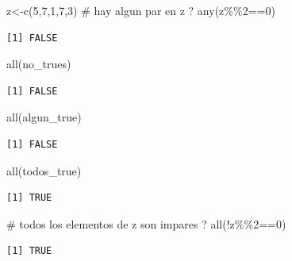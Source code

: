\documentclass[
  ignorenonframetext,
  aspectratio=169,
  spanish,
]{beamer}
\newenvironment{Shaded}{\begin{snugshade}}{\end{snugshade}}
\newcommand{\CommentTok}[1]{\textcolor[rgb]{0.37,0.37,0.37}{#1}}
\newcommand{\DecValTok}[1]{\textcolor[rgb]{0.68,0.00,0.00}{#1}}
\newcommand{\FunctionTok}[1]{\textcolor[rgb]{0.28,0.35,0.67}{#1}}
\newcommand{\NormalTok}[1]{\textcolor[rgb]{0.00,0.23,0.31}{#1}}
\newcommand{\OtherTok}[1]{\textcolor[rgb]{0.00,0.23,0.31}{#1}}
\newcommand{\SpecialCharTok}[1]{\textcolor[rgb]{0.37,0.37,0.37}{#1}}
\begin{document}
\begin{frame}[fragile]{}
\label{section-16}
\begin{Shaded}
\begin{Highlighting}[]
\NormalTok{z}\OtherTok{\textless{}{-}}\FunctionTok{c}\NormalTok{(}\DecValTok{5}\NormalTok{,}\DecValTok{7}\NormalTok{,}\DecValTok{1}\NormalTok{,}\DecValTok{7}\NormalTok{,}\DecValTok{3}\NormalTok{)}
\CommentTok{\# hay algun par en z ? }
\FunctionTok{any}\NormalTok{(z}\SpecialCharTok{\%\%}\DecValTok{2}\SpecialCharTok{==}\DecValTok{0}\NormalTok{)}
\end{Highlighting}
\end{Shaded}

\begin{verbatim}
[1] FALSE
\end{verbatim}
\end{frame}

\begin{frame}[fragile]{}
\label{section-17}
\begin{Shaded}
\begin{Highlighting}[]
\FunctionTok{all}\NormalTok{(no\_trues)}
\end{Highlighting}
\end{Shaded}

\begin{verbatim}
[1] FALSE
\end{verbatim}

\begin{Shaded}
\begin{Highlighting}[]
\FunctionTok{all}\NormalTok{(algun\_true)}
\end{Highlighting}
\end{Shaded}

\begin{verbatim}
[1] FALSE
\end{verbatim}

\begin{Shaded}
\begin{Highlighting}[]
\FunctionTok{all}\NormalTok{(todos\_true)}
\end{Highlighting}
\end{Shaded}

\begin{verbatim}
[1] TRUE
\end{verbatim}

\begin{Shaded}
\begin{Highlighting}[]
\CommentTok{\# todos los elementos de z son impares ?}
\FunctionTok{all}\NormalTok{(}\SpecialCharTok{!}\NormalTok{z}\SpecialCharTok{\%\%}\DecValTok{2}\SpecialCharTok{==}\DecValTok{0}\NormalTok{)}
\end{Highlighting}
\end{Shaded}

\begin{verbatim}
[1] TRUE
\end{verbatim}
\end{frame}
\end{document}
